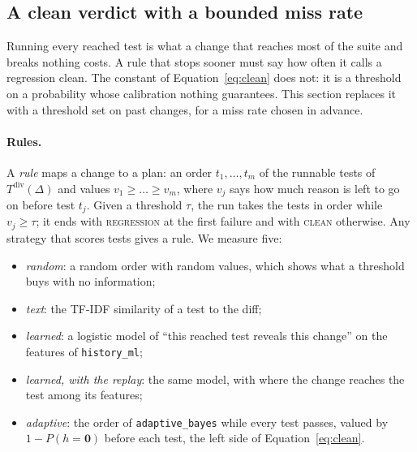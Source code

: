 \documentclass[11pt,a4paper]{article}
\newcommand{\strat}[1]{\texttt{#1}}
\newcommand{\clean}{\textsc{clean}}
\newcommand{\regression}{\textsc{regression}}
\begin{document}
\subsection{A clean verdict with a bounded miss rate}
\label{sec:stopping}

Running every reached test is what a change that reaches most of the suite and breaks nothing costs. A rule that
stops sooner must say how often it calls a regression clean. The constant of Equation~\ref{eq:clean} does not: it
is a threshold on a probability whose calibration nothing guarantees. This section replaces it with a threshold
set on past changes, for a miss rate chosen in advance.

\paragraph{Rules.} A \emph{rule} maps a change to a plan: an order $t_1, \dots, t_m$ of the runnable tests of
$T^{\mathrm{div}}(\Delta)$ and values $v_1 \ge \dots \ge v_m$, where $v_j$ says how much reason is left to go on
before test $t_j$. Given a threshold $\tau$, the run takes the tests in order while $v_j \ge \tau$; it ends with
\regression{} at the first failure and with \clean{} otherwise. Any strategy that scores tests gives a rule. We
measure five:
\begin{itemize}
  \item \emph{random}: a random order with random values, which shows what a threshold buys with no information;
  \item \emph{text}: the TF-IDF similarity of a test to the diff;
  \item \emph{learned}: a logistic model of ``this reached test reveals this change'' on the features of
        \strat{history\_ml};
  \item \emph{learned, with the replay}: the same model, with where the change reaches the test among its
        features;
  \item \emph{adaptive}: the order of \strat{adaptive\_bayes} while every test passes, valued by
        $1 - P(h = \mathbf{0})$ before each test, the left side of Equation~\ref{eq:clean}.
\end{itemize}
\end{document}
